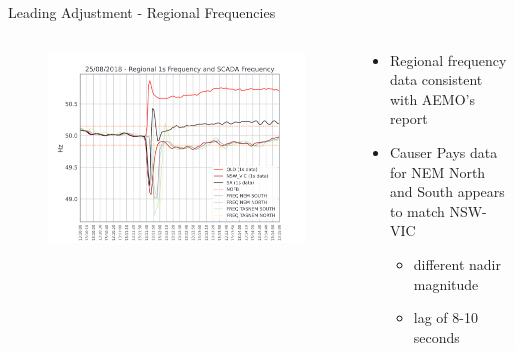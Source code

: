 \begin{frame}{Leading Adjustment - Regional Frequencies}

  \begin{columns}
    \begin{column}{0.6\linewidth}
    \begin{figure}
    \centering
        \includegraphics[width=\linewidth]{figures/regional_SCADA_frequencies.png}
        \label{fig:reg_freqs}
    \end{figure}
    \end{column}
    
    \begin{column}{0.4\linewidth}
    \begin{itemize}
        \item Regional frequency data consistent with AEMO's report
        \item Causer Pays data for NEM North and South appears to match NSW-VIC
            \begin{itemize}
                \item different nadir magnitude
                \item lag of 8-10 seconds
            \end{itemize}
    \end{itemize}
    \end{column}
  \end{columns}


\end{frame}

